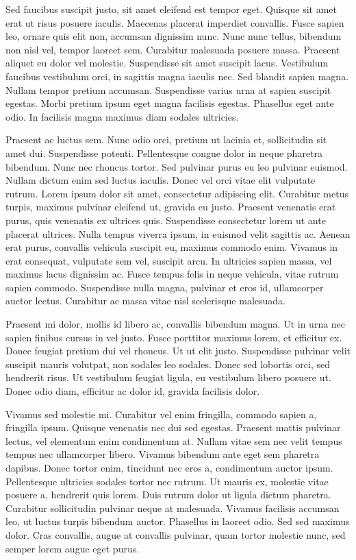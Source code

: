 Sed faucibus suscipit justo, sit amet eleifend est tempor eget. Quisque sit amet erat ut risus posuere iaculis. Maecenas placerat imperdiet convallis. Fusce sapien leo, ornare quis elit non, accumsan dignissim nunc. Nunc nunc tellus, bibendum non nisl vel, tempor laoreet sem. Curabitur malesuada posuere massa. Praesent aliquet eu dolor vel molestie. Suspendisse sit amet suscipit lacus. Vestibulum faucibus vestibulum orci, in sagittis magna iaculis nec. Sed blandit sapien magna. Nullam tempor pretium accumsan. Suspendisse varius urna at sapien suscipit egestas. Morbi pretium ipsum eget magna facilisis egestas. Phasellus eget ante odio. In facilisis magna maximus diam sodales ultricies.

Praesent ac luctus sem. Nunc odio orci, pretium ut lacinia et, sollicitudin sit amet dui. Suspendisse potenti. Pellentesque congue dolor in neque pharetra bibendum. Nunc nec rhoncus tortor. Sed pulvinar purus eu leo pulvinar euismod. Nullam dictum enim sed luctus iaculis. Donec vel orci vitae elit vulputate rutrum.
Lorem ipsum dolor sit amet, consectetur adipiscing elit. Curabitur metus turpis, maximus pulvinar eleifend ut, gravida eu justo. Praesent venenatis erat purus, quis venenatis ex ultrices quis. Suspendisse consectetur lorem ut ante placerat ultrices. Nulla tempus viverra ipsum, in euismod velit sagittis ac. Aenean erat purus, convallis vehicula suscipit eu, maximus commodo enim. Vivamus in erat consequat, vulputate sem vel, suscipit arcu. In ultricies sapien massa, vel maximus lacus dignissim ac. Fusce tempus felis in neque vehicula, vitae rutrum sapien commodo. Suspendisse nulla magna, pulvinar et eros id, ullamcorper auctor lectus. Curabitur ac massa vitae nisl scelerisque malesuada.

Praesent mi dolor, mollis id libero ac, convallis bibendum magna. Ut in urna nec sapien finibus cursus in vel justo. Fusce porttitor maximus lorem, et efficitur ex. Donec feugiat pretium dui vel rhoncus. Ut ut elit justo. Suspendisse pulvinar velit suscipit mauris volutpat, non sodales leo sodales. Donec sed lobortis orci, sed hendrerit risus. Ut vestibulum feugiat ligula, eu vestibulum libero posuere ut. Donec odio diam, efficitur ac dolor id, gravida facilisis dolor.

Vivamus sed molestie mi. Curabitur vel enim fringilla, commodo sapien a, fringilla ipsum. Quisque venenatis nec dui sed egestas. Praesent mattis pulvinar lectus, vel elementum enim condimentum at. Nullam vitae sem nec velit tempus tempus nec ullamcorper libero. Vivamus bibendum ante eget sem pharetra dapibus. Donec tortor enim, tincidunt nec eros a, condimentum auctor ipsum. Pellentesque ultricies sodales tortor nec rutrum. Ut mauris ex, molestie vitae posuere a, hendrerit quis lorem. Duis rutrum dolor ut ligula dictum pharetra. Curabitur sollicitudin pulvinar neque at malesuada. Vivamus facilisis accumsan leo, ut luctus turpis bibendum auctor. Phasellus in laoreet odio. Sed sed maximus dolor. Cras convallis, augue at convallis pulvinar, quam tortor molestie nunc, sed semper lorem augue eget purus.

